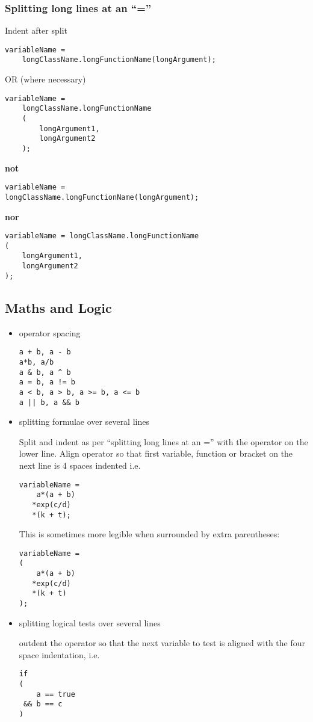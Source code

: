 \documentclass[11pt]{article}
\begin{document}
\subsubsection{Splitting long lines at an ``=''}
\label{sec-1-8-2}

     Indent after split

\begin{verbatim}
variableName =
    longClassName.longFunctionName(longArgument);
\end{verbatim}
     OR (where necessary)

\begin{verbatim}
variableName =
    longClassName.longFunctionName
    (
        longArgument1,
        longArgument2
    );
\end{verbatim}
     \textbf{not}

\begin{verbatim}
variableName =
longClassName.longFunctionName(longArgument);
\end{verbatim}
     \textbf{nor}

\begin{verbatim}
variableName = longClassName.longFunctionName
(
    longArgument1,
    longArgument2
);
\end{verbatim}
\subsection{Maths and Logic}
\label{sec-1-9}

\begin{itemize}
\item operator spacing

\begin{verbatim}
a + b, a - b
a*b, a/b
a & b, a ^ b
a = b, a != b
a < b, a > b, a >= b, a <= b
a || b, a && b
\end{verbatim}
\item splitting formulae over several lines

      Split and indent as per ``splitting long lines at an =''
      with the operator on the lower line.  Align operator so that first
      variable, function or bracket on the next line is 4 spaces indented i.e.

\begin{verbatim}
variableName =
    a*(a + b)
   *exp(c/d)
   *(k + t);
\end{verbatim}
      This is sometimes more legible when surrounded by extra parentheses:


\begin{verbatim}
variableName =
(
    a*(a + b)
   *exp(c/d)
   *(k + t)
);
\end{verbatim}
\item splitting logical tests over several lines

      outdent the operator so that the next variable to test is aligned with
      the four space indentation, i.e.

\begin{verbatim}
if
(
    a == true
 && b == c
)
\end{verbatim}
\end{itemize}
\end{document}
